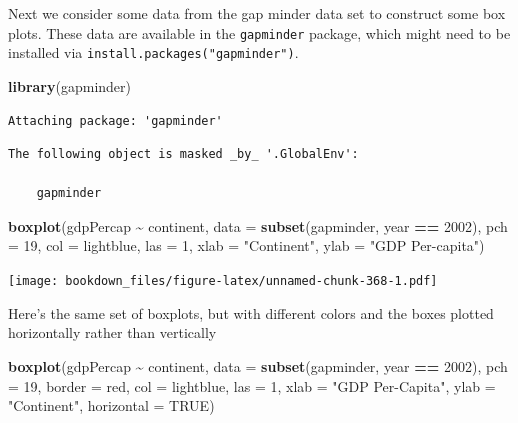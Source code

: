 \documentclass[
]{krantz}
\makeatletter
\newenvironment{Shaded}{\begin{snugshade}}{\end{snugshade}}
\newcommand{\DataTypeTok}[1]{\textcolor[rgb]{0.27,0.27,0.27}{#1}}
\newcommand{\DecValTok}[1]{\textcolor[rgb]{0.06,0.06,0.06}{#1}}
\newcommand{\KeywordTok}[1]{\textcolor[rgb]{0.27,0.27,0.27}{\textbf{#1}}}
\newcommand{\NormalTok}[1]{#1}
\newcommand{\OperatorTok}[1]{\textcolor[rgb]{0.43,0.43,0.43}{\textbf{#1}}}
\newcommand{\OtherTok}[1]{\textcolor[rgb]{0.37,0.37,0.37}{#1}}
\newcommand{\StringTok}[1]{\textcolor[rgb]{0.5,0.5,0.5}{#1}}
\newenvironment{kframe}{%
\medskip{}
\setlength{\fboxsep}{.8em}
 \def\at@end@of@kframe{}%
 \ifinner\ifhmode%
  \def\at@end@of@kframe{\end{minipage}}%
  \begin{minipage}{\columnwidth}%
 \fi\fi%
 \def\FrameCommand##1{\hskip\@totalleftmargin \hskip-\fboxsep
 \colorbox{shadecolor}{##1}\hskip-\fboxsep
     \hskip-\linewidth \hskip-\@totalleftmargin \hskip\columnwidth}%
 \MakeFramed {\advance\hsize-\width
   \@totalleftmargin\z@ \linewidth\hsize
   \@setminipage}}%
 {\par\unskip\endMakeFramed%
 \at@end@of@kframe}
\renewenvironment{Shaded}{\begin{kframe}}{\end{kframe}}
\makeatother
\begin{document}
Next we consider some data from the gap minder data set to construct some box plots. These data are available in the \texttt{gapminder} package, which might need to be installed via \texttt{install.packages("gapminder")}.

\begin{Shaded}
\begin{Highlighting}[]
\KeywordTok{library}\NormalTok{(gapminder)}
\end{Highlighting}
\end{Shaded}

\begin{verbatim}
Attaching package: 'gapminder'
\end{verbatim}

\begin{verbatim}
The following object is masked _by_ '.GlobalEnv':

    gapminder
\end{verbatim}

\begin{Shaded}
\begin{Highlighting}[]
\KeywordTok{boxplot}\NormalTok{(gdpPercap }\OperatorTok{\textasciitilde{}}\StringTok{ }\NormalTok{continent, }\DataTypeTok{data =} \KeywordTok{subset}\NormalTok{(gapminder, year }\OperatorTok{==}\StringTok{ }\DecValTok{2002}\NormalTok{), }\DataTypeTok{pch =} \DecValTok{19}\NormalTok{, }\DataTypeTok{col =} \StringTok{\textquotesingle{}lightblue\textquotesingle{}}\NormalTok{, }\DataTypeTok{las =} \DecValTok{1}\NormalTok{, }\DataTypeTok{xlab =} \StringTok{"Continent"}\NormalTok{, }\DataTypeTok{ylab =} \StringTok{"GDP Per{-}capita"}\NormalTok{)}
\end{Highlighting}
\end{Shaded}

\texttt{[image: bookdown\_files/figure-latex/unnamed-chunk-368-1.pdf]}

Here's the same set of boxplots, but with different colors and the boxes plotted horizontally rather than vertically

\begin{Shaded}
\begin{Highlighting}[]
\KeywordTok{boxplot}\NormalTok{(gdpPercap }\OperatorTok{\textasciitilde{}}\StringTok{ }\NormalTok{continent, }\DataTypeTok{data =} \KeywordTok{subset}\NormalTok{(gapminder, year }\OperatorTok{==}\StringTok{ }\DecValTok{2002}\NormalTok{), }\DataTypeTok{pch =} \DecValTok{19}\NormalTok{, }\DataTypeTok{border =} \StringTok{\textquotesingle{}red\textquotesingle{}}\NormalTok{, }\DataTypeTok{col =} \StringTok{\textquotesingle{}lightblue\textquotesingle{}}\NormalTok{, }\DataTypeTok{las =} \DecValTok{1}\NormalTok{, }\DataTypeTok{xlab =} \StringTok{"GDP Per{-}Capita"}\NormalTok{, }\DataTypeTok{ylab =} \StringTok{"Continent"}\NormalTok{, }\DataTypeTok{horizontal =} \OtherTok{TRUE}\NormalTok{)}
\end{Highlighting}
\end{Shaded}
\end{document}
